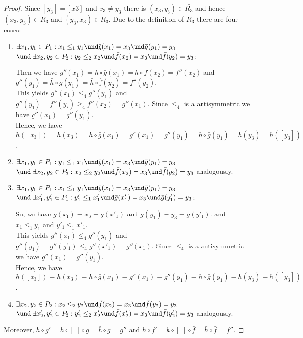 \begin{proof}
			Since 	$[y_3] = [x3]$ and $x_3 \neq y_3$ there is $(x_3,y_3) \in \bar{R_3}$  and hence $(x_3,y_3) \in R_3$ and $(y_3,x_3) \in R_3$. Due to the definition of $R_3$ there are four cases:
			
			\begin{enumerate}
				\item $\exists x_1,y_1 \in P_1 : x_1 \le_1 y_1 \und \bar{g}(x_1) = x_3 \und \bar{g}(y_1) = y_3 $\\
				      $\und  \; \exists x_2,y_2 \in P_2 : y_2 \le_2 x_2 \und \bar{f}(x_2) = x_3 \und \bar{f}(y_2) = y_3 $:
							
							Then we have $g''(x_1) = \bar{h} \circ \bar{g} (x_1) =  \bar{h} \circ \bar{f} (x_2) = f''(x_2) $
							and $g''(y_1) = \bar{h} \circ \bar{g} (y_1) =  \bar{h} \circ \bar{f} (y_2) = f''(y_2) $.\\
							This yields
							$g''(x_1) \le_4 g''(y_1)$  and $g''(y_1) = f''(y_2) \ge_4 f''(x_2) = g''(x_1)$. Since $\le_4$ is a antisymmetric we have $g''(x_1)= g''(y_1)$.\\
							Hence, we have $h([x_3]) = \bar{h}(x_3) = \bar{h}\circ \bar{g} (x_1) = g''(x_1)= g''(y_1) =
							\bar{h}\circ \bar{g} (y_1) = \bar{h}(y_3) = h([y_3])$. \\
					\item $\exists x_1,y_1 \in P_1 : y_1 \le_1 x_1 \und \bar{g}(x_1) = x_3 \und \bar{g}(y_1) = y_3 $\\
				      $ \und  \; \exists x_2,y_2 \in P_2 : x_2 \le_2 y_2 \und \bar{f}(x_2) = x_3 \und \bar{f}(y_2) = y_3 $ analogously.\\
					\item $\exists x_1,y_1 \in P_1 : x_1 \le_1 y_1 \und \bar{g}(x_1) = x_3 \und \bar{g}(y_1) = y_3 $\\
				      $ \und \; \exists x'_1,y'_1 \in P_1 : y'_1 \le_1 x'_1 \und \bar{g}(x'_1) = x_3 \und \bar{g}(y'_1) = y_3 $:
							
							So, we have $\bar{g}(x_1) = x_3 = \bar{g}(x'_1)$ and $\bar{g}(y_1) = y_3 = \bar{g}(y'_1)$. and 
							   $x_1 \le_1 y_1$ and $ y'_1 \le_1 x'_1$.\\
This yields
							$g''(x_1) \le_4 g''(y_1)$  and $g''(y_1) = g''(y'_1) \le_4 g''(x'_1) = g''(x_1)$. Since $\le_4$ is a antisymmetric we have $g''(x_1)= g''(y_1)$.\\
							Hence, we have $h([x_3]) = \bar{h}(x_3) = \bar{h}\circ \bar{g} (x_1) = g''(x_1)= g''(y_1) =
							\bar{h}\circ \bar{g} (y_1) = \bar{h}(y_3) = h([y_3])$. \\
					\item $\exists x_2,y_2 \in P_2 : x_2 \le_2 y_2 \und \bar{f}(x_2) = x_3 \und \bar{f}(y_2) = y_3 $\\
				      $ \und \; \exists x'_2,y'_2 \in P_2 : y'_2 \le_2 x'_2 \und \bar{f}(x'_2) = x_3 \und \bar{f}(y'_2) = y_3 $
							analogously.
			\end{enumerate}
			Moreover, $h \circ g' = h \circ [\_] \circ  \bar{g} = \bar{h} \circ  \bar{g} = g''$ and 
			$h \circ f' = h \circ [\_] \circ  \bar{f} = \bar{h} \circ  \bar{f} = f''$.
			
\end{proof}

